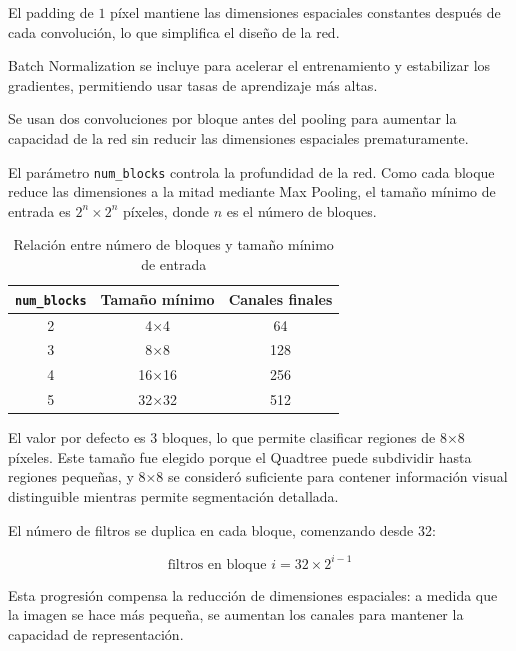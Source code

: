 \documentclass[onecolumn, 12pt , journal]{IEEEtran}
\begin{document}
El padding de $1$ píxel mantiene las dimensiones espaciales constantes después 
de cada convolución, lo que simplifica el diseño de la red.

Batch Normalization se incluye para acelerar el entrenamiento y estabilizar 
los gradientes, permitiendo usar tasas de aprendizaje más altas.

Se usan dos convoluciones por bloque antes del pooling para aumentar la 
capacidad de la red sin reducir las dimensiones espaciales prematuramente.


El parámetro \texttt{num\_blocks} controla la profundidad de la red. Como cada 
bloque reduce las dimensiones a la mitad mediante Max Pooling, el tamaño mínimo 
de entrada es $2^{n} \times 2^{n}$ píxeles, donde $n$ es el número de bloques.

\begin{table}[h]
\centering
\caption{Relación entre número de bloques y tamaño mínimo de entrada}
\begin{tabular}{ccc}
\toprule
\texttt{num\_blocks} & Tamaño mínimo & Canales finales \\
\midrule
2 & 4×4 & 64 \\
3 & 8×8 & 128 \\
4 & 16×16 & 256 \\
5 & 32×32 & 512 \\
\bottomrule
\end{tabular}
\label{tab:cnn_blocks}
\end{table}

El valor por defecto es 3 bloques, lo que permite clasificar regiones de 8×8 
píxeles. Este tamaño fue elegido porque el Quadtree puede subdividir hasta 
regiones pequeñas, y 8×8 se consideró suficiente para contener información visual 
distinguible mientras permite segmentación detallada.


El número de filtros se duplica en cada bloque, comenzando desde 32:

\begin{equation}
    \text{filtros en bloque } i = 32 \times 2^{i-1}
\end{equation}

Esta progresión compensa la reducción de dimensiones espaciales: a medida que 
la imagen se hace más pequeña, se aumentan los canales para mantener la 
capacidad de representación.
\end{document}
